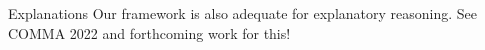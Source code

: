 \documentclass[aspectratio=169]{beamer}
\begin{document}
\begin{frame}{Explanations}
    Our framework is also adequate for explanatory reasoning. See COMMA 2022 and forthcoming work for this!
\end{frame}

\end{document}
